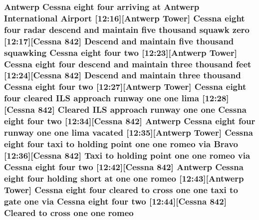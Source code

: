 \subsubsection[{\texorpdfstring{romeo}{romeo}}]{\setlength{\rightskip}{0pt plus 5cm}Antwerp {\bf Cessna} eight four arriving at Antwerp International {\bf Airport} \mbox{[}12\+:16\mbox{]}\mbox{[}Antwerp {\bf Tower}\mbox{]} {\bf Cessna} eight four radar descend and maintain five {\bf thousand} squawk {\bf zero} \mbox{[}12\+:17\mbox{]}\mbox{[}{\bf Cessna} 842\mbox{]} Descend and maintain five {\bf thousand} {\bf squawking} {\bf Cessna} eight four {\bf two} \mbox{[}12\+:23\mbox{]}\mbox{[}Antwerp {\bf Tower}\mbox{]} {\bf Cessna} eight four descend and maintain three {\bf thousand} {\bf feet} \mbox{[}12\+:24\mbox{]}\mbox{[}{\bf Cessna} 842\mbox{]} Descend and maintain three {\bf thousand} {\bf Cessna} eight four {\bf two} \mbox{[}12\+:27\mbox{]}\mbox{[}Antwerp {\bf Tower}\mbox{]} {\bf Cessna} eight four cleared I\+LS approach runway {\bf one} {\bf one} {\bf lima} \mbox{[}12\+:28\mbox{]}\mbox{[}{\bf Cessna} 842\mbox{]} Cleared I\+LS approach runway {\bf one} {\bf one} {\bf Cessna} eight four {\bf two} \mbox{[}12\+:34\mbox{]}\mbox{[}{\bf Cessna} 842\mbox{]} Antwerp {\bf Cessna} eight four runway {\bf one} {\bf one} {\bf lima} vacated \mbox{[}12\+:35\mbox{]}\mbox{[}Antwerp {\bf Tower}\mbox{]} {\bf Cessna} eight four taxi to holding point {\bf one} {\bf one} romeo via {\bf Bravo} \mbox{[}12\+:36\mbox{]}\mbox{[}{\bf Cessna} 842\mbox{]} Taxi to holding point {\bf one} {\bf one} romeo via {\bf Cessna} eight four {\bf two} \mbox{[}12\+:42\mbox{]}\mbox{[}{\bf Cessna} 842\mbox{]} Antwerp {\bf Cessna} eight four holding short at {\bf one} {\bf one} romeo \mbox{[}12\+:43\mbox{]}\mbox{[}Antwerp {\bf Tower}\mbox{]} {\bf Cessna} eight four cleared to cross {\bf one} {\bf one} taxi to gate {\bf one} via {\bf Cessna} eight four {\bf two} \mbox{[}12\+:44\mbox{]}\mbox{[}{\bf Cessna} 842\mbox{]} Cleared to cross {\bf one} {\bf one} romeo}\hypertarget{happyDay2ExpectedATC_8txt_a62f290627a5be640635e9ce3b0df1027}{}\label{happyDay2ExpectedATC_8txt_a62f290627a5be640635e9ce3b0df1027}
